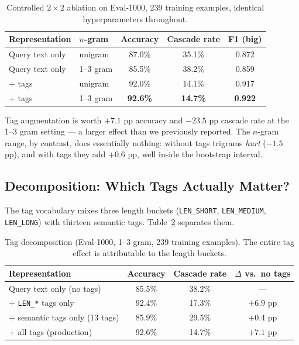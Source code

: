 \documentclass{article}
\begin{document}
\begin{table}[t]
\caption{Controlled $2\times2$ ablation on Eval-1000, 239 training examples,
identical hyperparameters throughout.}
\label{tab:ablation}
\centering
\begin{tabular}{llccc}
\toprule
\textbf{Representation} & \textbf{$n$-gram} & \textbf{Accuracy} & \textbf{Cascade rate} & \textbf{F1 (big)} \\
\midrule
Query text only & unigram   & 87.0\% & 35.1\% & 0.872 \\
Query text only & 1--3 gram & 85.5\% & 38.2\% & 0.859 \\
$+$ tags        & unigram   & 92.0\% & 14.1\% & 0.917 \\
$+$ tags        & 1--3 gram & \textbf{92.6\%} & \textbf{14.7\%} & \textbf{0.922} \\
\bottomrule
\end{tabular}
\end{table}

Tag augmentation is worth $+7.1$ pp accuracy and $-23.5$ pp cascade rate at
the 1--3 gram setting --- a larger effect than we previously reported. The
$n$-gram range, by contrast, does essentially nothing: without tags trigrams
\emph{hurt} ($-1.5$ pp), and with tags they add $+0.6$ pp, well inside the
bootstrap interval.

\subsection{Decomposition: Which Tags Actually Matter?}
\label{sec:decomposition}

The tag vocabulary mixes three length buckets (\texttt{LEN\_SHORT},
\texttt{LEN\_MEDIUM}, \texttt{LEN\_LONG}) with thirteen semantic tags. Table~\ref{tab:decomp}
separates them.

\begin{table}[t]
\caption{Tag decomposition (Eval-1000, 1--3 gram, 239 training examples).
The entire tag effect is attributable to the length buckets.}
\label{tab:decomp}
\centering
\begin{tabular}{lccc}
\toprule
\textbf{Representation} & \textbf{Accuracy} & \textbf{Cascade rate} & \textbf{$\Delta$ vs.\ no tags} \\
\midrule
Query text only (no tags)          & 85.5\% & 38.2\% & --- \\
$+$ \texttt{LEN\_*} tags only      & 92.4\% & 17.3\% & $+6.9$ pp \\
$+$ semantic tags only (13 tags)   & 85.9\% & 29.5\% & $+0.4$ pp \\
$+$ all tags (production)          & 92.6\% & 14.7\% & $+7.1$ pp \\
\bottomrule
\end{tabular}
\end{table}
\end{document}
